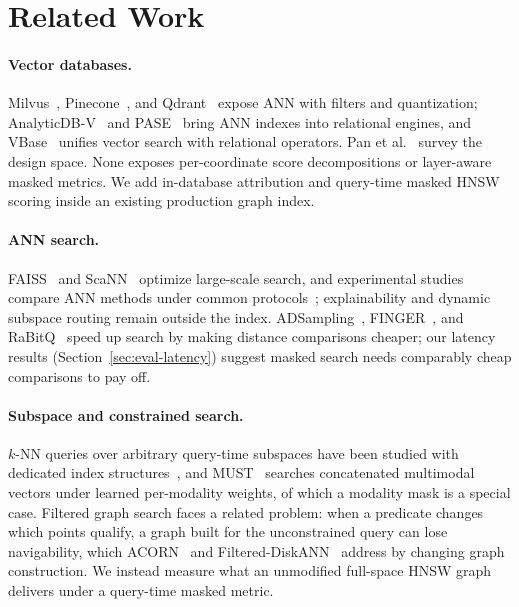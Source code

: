 \documentclass[sigconf,review,balance=false]{acmart}
\begin{document}
\section{Related Work}
\label{sec:related}

\paragraph{Vector databases.} Milvus~\cite{wang2021milvus},
Pinecone~\cite{pinecone2023}, and Qdrant~\cite{qdrant2024} expose ANN with
filters and quantization; AnalyticDB-V~\cite{wei2020analyticdbv} and
PASE~\cite{yang2020pase} bring ANN indexes into relational engines, and VBase~\cite{zhang2023vbase} unifies vector search with
relational operators. Pan et al.~\cite{pan2024survey} survey the design
space. None exposes per-coordinate score decompositions or layer-aware masked
metrics. We add in-database attribution and query-time masked HNSW scoring
inside an existing production graph index.

\paragraph{ANN search.} FAISS~\cite{johnson2019faiss} and
ScaNN~\cite{guo2020scann} optimize large-scale search, and experimental
studies compare ANN methods under common
protocols~\cite{wang2021graphsurvey,aumuller2020annbench,echihabi2019hydra};
explainability and dynamic subspace routing remain outside the index.
ADSampling~\cite{gao2023adsampling}, FINGER~\cite{chen2023finger}, and
RaBitQ~\cite{gao2024rabitq} speed up search by making distance comparisons
cheaper; our latency results (Section~\ref{sec:eval-latency}) suggest masked
search needs comparably cheap comparisons to pay off.

\paragraph{Subspace and constrained search.} $k$-NN queries over arbitrary
query-time subspaces have been studied with dedicated index
structures~\cite{lian2008subspace,bernecker2010subspace}, and
MUST~\cite{wang2024must} searches concatenated multimodal vectors under
learned per-modality weights, of which a modality mask is a special case.
Filtered graph
search faces a related problem: when a predicate changes which points
qualify, a graph built for the unconstrained query can lose navigability,
which ACORN~\cite{patel2024acorn} and
Filtered-DiskANN~\cite{gollapudi2023filtered} address by changing graph
construction. We instead measure what an unmodified full-space HNSW graph
delivers under a query-time masked metric.
\end{document}
